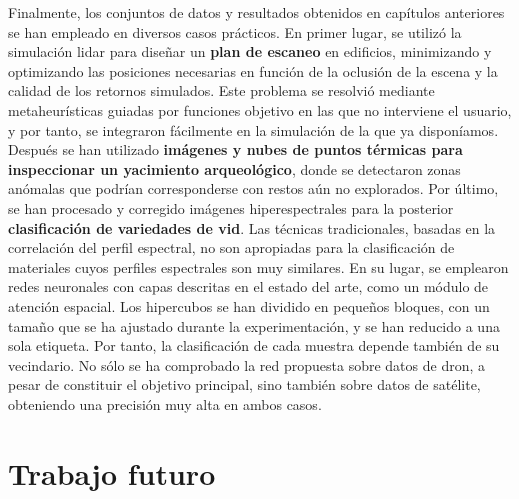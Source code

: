 Finalmente, los conjuntos de datos y resultados obtenidos en capítulos anteriores se han empleado en diversos casos prácticos. En primer lugar, se utilizó la simulación \acrshort{lidar} para diseñar un \textbf{plan de escaneo} en edificios, minimizando y optimizando las posiciones necesarias en función de la oclusión de la escena y la calidad de los retornos simulados. Este problema se resolvió mediante metaheurísticas guiadas por funciones objetivo en las que no interviene el usuario, y por tanto, se integraron fácilmente en la simulación de la que ya disponíamos. Después se han utilizado \textbf{imágenes y nubes de puntos térmicas para inspeccionar un yacimiento arqueológico}, donde se detectaron zonas anómalas que podrían corresponderse con restos aún no explorados. Por último, se han procesado y corregido imágenes hiperespectrales para la posterior \textbf{clasificación de variedades de vid}. Las técnicas tradicionales, basadas en la correlación del perfil espectral, no son apropiadas para la clasificación de materiales cuyos perfiles espectrales son muy similares. En su lugar, se emplearon redes neuronales con capas descritas en el estado del arte, como un módulo de atención espacial. Los hipercubos se han dividido en pequeños bloques, con un tamaño que se ha ajustado durante la experimentación, y se han reducido a una sola etiqueta. Por tanto, la clasificación de cada muestra depende también de su vecindario. No sólo se ha comprobado la red propuesta sobre datos de dron, a pesar de constituir el objetivo principal, sino también sobre datos de satélite, obteniendo una precisión muy alta en ambos casos. 

\section{Trabajo futuro}

